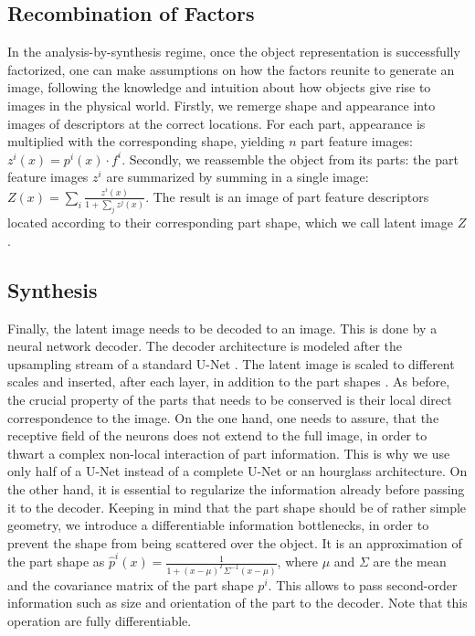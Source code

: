 	\subsection{Recombination of Factors}
		In the analysis-by-synthesis regime, once the object representation is successfully factorized, one can make assumptions on how the factors reunite to generate an image, following the knowledge and intuition about how objects give rise to images in the physical world.
		Firstly, we remerge shape and appearance into images of descriptors at the correct locations. For each part, appearance is multiplied with the corresponding shape, yielding $n$ part feature images: $z^i(x) = p^i(x) \cdot f^i$.
		Secondly, we reassemble the object from its parts: the part feature images $z^i$ are summarized by summing in a single image: $ Z(x) = \sum_i \frac{z^i(x)}{1 + \sum_j z^j(x)}$. The result is an image of part feature descriptors located according to their corresponding part shape, which we call latent image $Z$.\\


	\subsection{Synthesis}
		Finally, the latent image needs to be decoded to an image. This is done by a neural network decoder. The decoder architecture is modeled after the upsampling stream of a standard U-Net \cite{ronneberger15unet}. The latent image is scaled to different scales  and inserted, after each layer, in addition to the part shapes . As before, the crucial property of the parts that needs to be conserved is their local direct correspondence to the image. On the one hand, one needs to assure, that the receptive field of the neurons does not extend to the full image, in order to thwart a complex non-local interaction of part information. This is why we use only half of a U-Net instead of a complete U-Net or an hourglass architecture.
		On the other hand, it is essential to regularize the information already before passing it to the decoder. Keeping in mind that the part shape should be of rather simple geometry, we introduce a differentiable information bottlenecks, in order to prevent the shape from being scattered over the object. It is an approximation of the part shape as $\hat p^i(x) = \frac{1}{1 + (x -\mu)^T \Sigma^{-1} (x - \mu)}$, where $\mu$ and $\Sigma$ are the mean and the covariance matrix of the part shape $p^i$. This allows to pass second-order information such as size and orientation of the part to the decoder. Note that this operation are fully differentiable.


